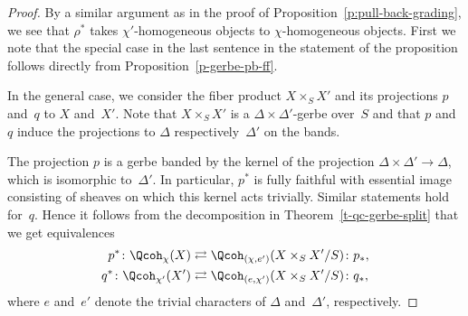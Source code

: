 \begin{proof}
By a similar argument as in the proof of Proposition~\ref{p:pull-back-grading},
we see that $\rho^*$
takes $\chi'$-homogeneous objects to 
$\chi$-homogeneous objects.
First we note that the special case in the last
sentence in the statement of the proposition follows
directly from 
Proposition~\ref{p-gerbe-pb-ff}.

In the general case, we consider the fiber product $X\times_S X'$
and its projections $p$ and~$q$ to $X$ and~$X'$.
Note that $X\times_S X'$ is a $\Delta\times\Delta'$-gerbe over~$S$
and that $p$ and~$q$ induce the projections to $\Delta$ respectively~$\Delta'$
on the bands.

The projection $p$ is a gerbe banded by the kernel of the
projection $\Delta\times\Delta' \to \Delta$,
which is isomorphic to~$\Delta'$.
In particular, $p^*$ is fully faithful with essential image consisting of sheaves
on which this kernel acts trivially.
Similar statements hold for~$q$.
Hence it follows from the decomposition in Theorem~\ref{t-qc-gerbe-split}
that we get equivalences
\begin{align}
  \label{eq:equiv-p}
  p^* \colon \Qcoh_\chi(X)
  & \rightleftarrows \Qcoh_{(\chi,e')}(X \times_S X'/S)\colon p_*,\\
  \label{eq:equiv-q}
  q^* \colon \Qcoh_{\chi'}(X')
  & \rightleftarrows \Qcoh_{(e, \chi')}(X \times_S X'/S)\colon q_*,
\end{align}
where $e$ and~$e'$ denote the trivial characters of $\Delta$ and~$\Delta'$,
respectively.


\end{proof}
